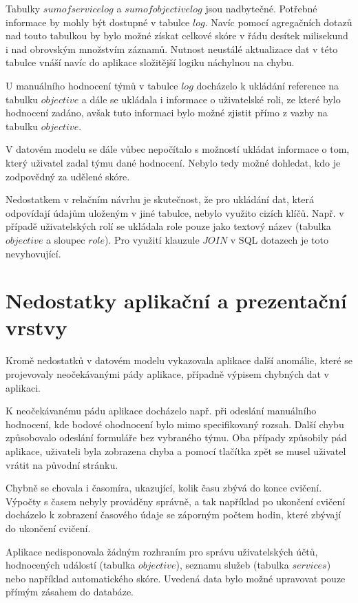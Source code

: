 \documentclass[
  digital, %
  twoside, %
  table,   %
  nolof,     %
  nolot,     %
]{fithesis3}
\begin{document}
Tabulky $sumofservicelog$ a $sumofobjectivelog$ jsou nadbytečné. Potřebné informace by mohly být dostupné v tabulce $log$. Navíc pomocí agregačních dotazů nad touto tabulkou by bylo možné získat celkové skóre v řádu desítek milisekund i nad obrovským množstvím záznamů. Nutnost neustálé aktualizace dat v této tabulce vnáší navíc do aplikace složitější logiku náchylnou na chybu. 

U manuálního hodnocení týmů v tabulce $log$ docházelo k ukládání reference na tabulku $objective$ a dále se ukládala i informace o uživatelské roli, ze které bylo hodnocení zadáno, avšak tuto informaci bylo možné zjistit přímo z vazby na tabulku $objective$.

V datovém modelu se dále vůbec nepočítalo s možností ukládat informace o tom, který uživatel zadal týmu dané hodnocení. Nebylo tedy možné dohledat, kdo je zodpovědný za udělené skóre.

Nedostatkem v relačním návrhu je skutečnost, že pro ukládání dat, která odpovídají údajům uloženým v jiné tabulce, nebylo využito cizích klíčů. Např. v případě uživatelských rolí se ukládala role pouze jako textový název  (tabulka $objective$ a sloupec $role$). Pro využití klauzule $JOIN$ v SQL dotazech je toto nevyhovující.

\section{Nedostatky aplikační a prezentační vrstvy}

Kromě nedostatků v datovém modelu vykazovala aplikace další anomálie, které se projevovaly neočekávanými pády aplikace, případně výpisem chybných dat v aplikaci.

K neočekávanému pádu aplikace docházelo např. při odeslání manuálního hodnocení, kde bodové ohodnocení bylo mimo specifikovaný rozsah. Další chybu způsobovalo odeslání formuláře bez vybraného týmu. Oba případy způsobily pád aplikace, uživateli byla zobrazena chyba a pomocí tlačítka zpět se musel uživatel vrátit na původní stránku.

Chybně se chovala i časomíra, ukazující, kolik času zbývá do konce cvičení. Výpočty s časem nebyly prováděny správně, a tak například po ukončení cvičení docházelo k zobrazení časového údaje se záporným počtem hodin, které zbývají do ukončení cvičení.

Aplikace nedisponovala žádným rozhraním pro správu uživatelských účtů, hodnocených událostí (tabulka $objective$), seznamu služeb (tabulka $services$) nebo například automatického skóre. Uvedená data bylo možné upravovat pouze přímým zásahem do databáze.
\end{document}
